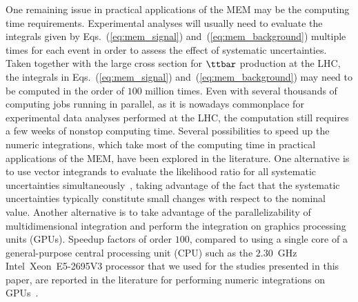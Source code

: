 One remaining issue in practical applications of the MEM may be the computing time requirements.
Experimental analyses will usually need to evaluate the integrals given by Eqs.~(\ref{eq:mem_signal}) and~(\ref{eq:mem_background})
multiple times for each event in order to assess the effect of systematic uncertainties.
Taken together with the large cross section for $\ttbar$ production at the LHC,
the integrals in Eqs.~(\ref{eq:mem_signal}) and~(\ref{eq:mem_background}) may need to be computed in the order of $100$ million times.
Even with several thousands of computing jobs running in parallel,
as it is nowadays commonplace for experimental data analyses performed at the LHC,
the computation still requires a few weeks of nonstop computing time.
Several possibilities to speed up the numeric integrations, which take most of the computing time in practical applications of the MEM,
have been explored in the literature.
One alternative is to use vector integrands to evaluate the likelihood ratio for all systematic uncertainties simultaneously~\cite{CUBA},
taking advantage of the fact that the systematic uncertainties typically constitute small changes with respect to the nominal value.
Another alternative is to take advantage of the parallelizability of multidimensional integration and perform the integration on graphics processing units (GPUs).
Speedup factors of order $100$, compared to using a single core of a general-purpose central processing unit (CPU) 
such as the $2.30$~GHz Intel\TReg~Xeon\TReg~E5-2695V3 processor that we used for the studies presented in this paper,
are reported in the literature for performing numeric integrations on GPUs~\cite{Hagiwara:2009aq,Hagiwara:2009cy,Kanzaki:2010ym,Hagiwara:2013oka,Schouten:2014yza,Grasseau:2015vfa}.
